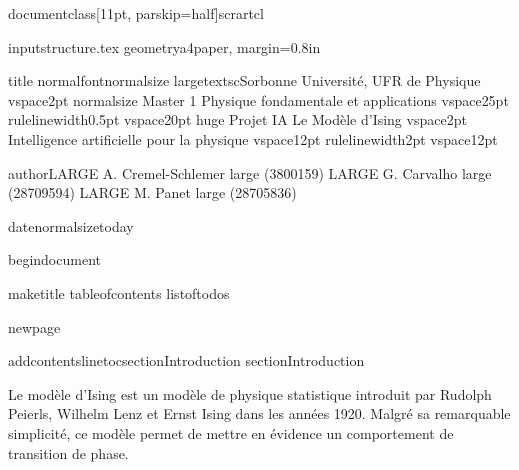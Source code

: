 %
%
%
% 


documentclass[11pt, parskip=half]{scrartcl} %

input{structure.tex} %
geometry{a4paper, margin=0.8in}


title{	
	normalfontnormalsize
	largetextsc{Sorbonne Université, UFR de Physique} %
	vspace{2pt} %
	normalsize Master 1  Physique fondamentale et applications
	vspace{25pt} %
	rule{linewidth}{0.5pt} %
	vspace{20pt} %
	{huge Projet IA  Le Modèle d'Ising} %
	vspace{2pt} %
	{Intelligence artificielle pour la physique}
	vspace{12pt} %
	rule{linewidth}{2pt} %
	vspace{12pt} %
}

author{LARGE A. Cremel-Schlemer large (3800159)  LARGE G. Carvalho large (28709594)  LARGE M. Panet large (28705836)} %

date{normalsizetoday} %

begin{document}

maketitle %
tableofcontents %
listoftodos %

newpage

addcontentsline{toc}{section}{Introduction}
section{Introduction}

Le modèle d'Ising est un modèle de physique statistique introduit par Rudolph Peierls, Wilhelm Lenz et Ernst Ising dans les années 1920. Malgré sa remarquable simplicité, ce modèle permet de mettre en évidence un comportement de transition de phase.

